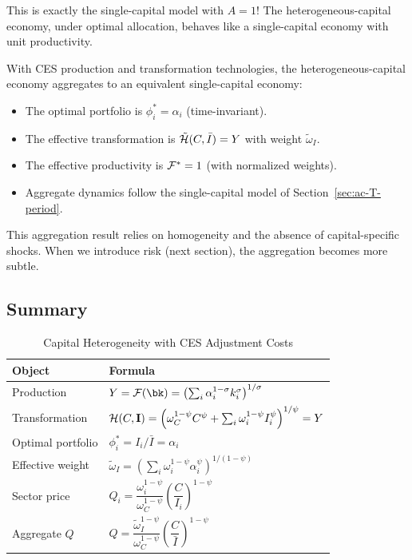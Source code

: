 This is exactly the single-capital model with $A = 1$! The heterogeneous-capital economy, under optimal allocation, behaves like a single-capital economy with unit productivity.

\begin{callouttip}
With CES production and transformation technologies, the heterogeneous-capital economy aggregates to an equivalent single-capital economy:
\begin{itemize}[nosep]
\item The optimal portfolio is $\phi_i^* = \alpha_i$ (time-invariant).
\item The effective transformation is $\tilde{\mathcal{H}}(C, \bar{I}) = Y$ with weight $\tilde{\omega}_I$.
\item The effective productivity is $\mathcal{F}^* = 1$ (with normalized weights).
\item Aggregate dynamics follow the single-capital model of Section~\ref{sec:ac-T-period}.
\end{itemize}
This aggregation result relies on homogeneity and the absence of capital-specific shocks. When we introduce risk (next section), the aggregation becomes more subtle.
\end{callouttip}

\subsection{Summary}
\label{subsec:ac-het-summary}

\begin{table}[H]
\centering
\caption{Capital Heterogeneity with CES Adjustment Costs}
\label{tab:ac-het-summary}
\renewcommand{\arraystretch}{1.6}
\begin{tabular}{@{}ll@{}}
\toprule
\textbf{Object} & \textbf{Formula} \\
\midrule
Production & $Y = \F(\bk) = \left( \sum_i \alpha_i^{1-\sigma} k_i^{\sigma} \right)^{1/\sigma}$ \\[6pt]
Transformation & $\mathcal{H}(C, \mathbf{I}) = \left( \omega_C^{1-\psi} C^{\psi} + \sum_i \omega_i^{1-\psi} I_i^{\psi} \right)^{1/\psi} = Y$ \\[6pt]
Optimal portfolio & $\phi_i^* = I_i / \bar{I} = \alpha_i$ \\[6pt]
Effective weight & $\tilde{\omega}_I = \left( \sum_i \omega_i^{1-\psi} \alpha_i^{\psi} \right)^{1/(1-\psi)}$ \\[6pt]
Sector price & $Q_i = \dfrac{\omega_i^{1-\psi}}{\omega_C^{1-\psi}} \left( \dfrac{C}{I_i} \right)^{1-\psi}$ \\[10pt]
Aggregate $Q$ & $Q = \dfrac{\tilde{\omega}_I^{1-\psi}}{\omega_C^{1-\psi}} \left( \dfrac{C}{\bar{I}} \right)^{1-\psi}$ \\[10pt]
\bottomrule
\end{tabular}
\end{table}

